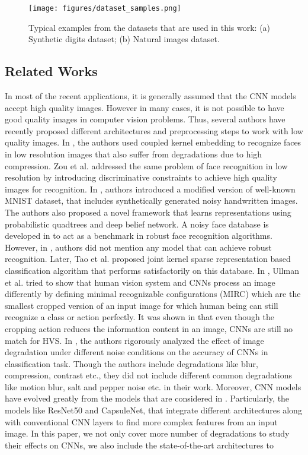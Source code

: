 \documentclass[10pt, journal, compsoc]{IEEEtran}
\begin{document}
\vspace{0.7cm}

\begin{figure}
\texttt{[image: figures/dataset\_samples.png]}
\caption{Typical examples from the datasets that are used in this work: (a) Synthetic digits dataset; (b) Natural images dataset.}
\label{fig:dataset_samples}
\end{figure}

\subsection{Related Works}\label{sec:relatedwork}
In most of the recent applications, it is generally assumed that the CNN models accept high quality images. However in many cases, it is not possible to have good quality images in computer vision problems. Thus, several authors have recently proposed different architectures and preprocessing steps to work with low quality images. In \cite{ren2012coupled}, the authors used coupled kernel embedding to recognize faces in low resolution images that also suffer from degradations due to high compression. Zou et al. \cite{zou2012very} addressed the same problem of face recognition in low resolution by introducing discriminative constraints to achieve high quality images for recognition. In \cite{basu2017learning}, authors introduced a modified version of well-known MNIST dataset, that includes synthetically generated noisy handwritten images. The authors also proposed a novel framework that learns representations using probabilistic quadtrees and deep belief network. A noisy face database is developed in \cite{karam2015quality} to act as a benchmark in robust face recognition algorithms. However, in \cite{karam2015quality}, authors did not mention any model that can achieve robust recognition. Later, Tao et al. \cite{tao2016multi} proposed joint kernel sparse representation based classification algorithm that performs satisfactorily on this database. In \cite{ullman2016atoms}, Ullman et al. tried to show that human vision system and CNNs process an image differently by defining minimal recognizable configurations (MIRC) which are the smallest cropped version of an input image for which human being can still recognize a class or action perfectly. It was shown in \cite{ullman2016atoms} that even though the cropping action reduces the information content in an image, CNNs are still no match for HVS. In \cite{dodge2016understanding}, the authors rigorously analyzed the effect of image degradation under different noise conditions on the accuracy of CNNs in classification task. Though the authors include degradations like blur, compression, contrast etc., they did not include different common degradations like motion blur, salt and pepper noise etc. in their work. Moreover, CNN models have evolved greatly from the models that are considered in \cite{dodge2016understanding}. Particularly, the models like ResNet50 and CapsuleNet, that integrate different architectures along with conventional CNN layers to find more complex features from an input image. In this paper, we not only cover more number of degradations to study their effects on CNNs, we also include the state-of-the-art architectures to 
\end{document}
